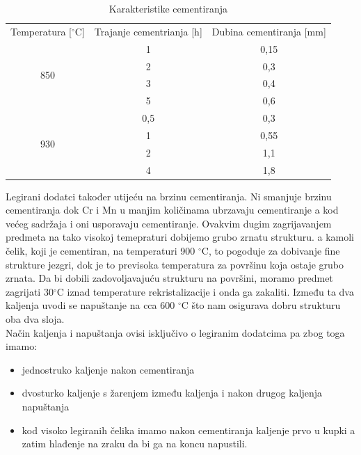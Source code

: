 \documentclass[a4paper,12pt]{article}
\numberwithin{figure}{section}
\begin{document}
\begin{table}[!h]
\centering
\caption{Karakteristike cementiranja}
\label{my-label}
\begin{tabular}{ccc}
Temperatura {[}$^{\circ}$C{]}   & Trajanje cementrianja {[}h{]} & Dubina cementiranja {[}mm{]} \\
\multirow{4}{*}{850} & 1                             & 0,15                         \\
                     & 2                             & 0,3                          \\
                     & 3                             & 0,4                          \\
                     & 5                             & 0,6                          \\
\multirow{4}{*}{930} & 0,5                           & 0,3                          \\
                     & 1                             & 0,55                         \\
                     & 2                             & 1,1                          \\
                     & 4                             & 1,8                         
\end{tabular}
\end{table}
\FloatBarrier
Legirani dodatci također utijeću na brzinu cementiranja. Ni smanjuje brzinu cementiranja dok Cr i Mn u manjim količinama ubrzavaju cementiranje a kod većeg sadržaja i oni usporavaju cementiranje. Ovakvim dugim zagrijavanjem predmeta na tako visokoj temepraturi dobijemo grubo zrnatu strukturu. a kamoli čelik, koji je cementiran, na temperaturi 900 $^{\circ}$C, to pogoduje za dobivanje fine strukture jezgri, dok je to previsoka temperatura za površinu koja ostaje grubo zrnata. Da bi dobili zadovoljavajuću strukturu na površini, moramo predmet zagrijati 30$^{\circ}$C iznad temperature rekristalizacije i onda ga zakaliti. Između ta dva kaljenja uvodi se napuštanje na cca 600 $^{\circ}$C što nam osigurava dobru strukturu oba dva sloja. \\
Način kaljenja i napuštanja ovisi isključivo o legiranim dodatcima pa zbog toga imamo:
\begin{itemize}
\item jednostruko kaljenje nakon cementiranja
\item dvosturko kaljenje s žarenjem između kaljenja i nakon drugog kaljenja napuštanja
\item kod visoko legiranih čelika imamo nakon cementiranja kaljenje prvo u kupki a zatim hlađenje na zraku da bi ga na koncu napustili.
\end{itemize}
\end{document}

